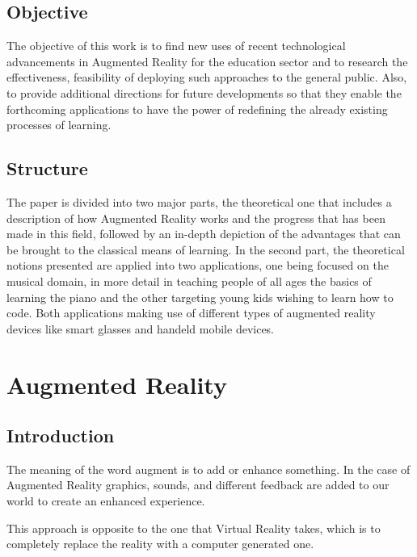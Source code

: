 \documentclass[12 pct]{report}
\begin{document}
\section{Objective}
The objective of this work is to find new uses of recent technological advancements in Augmented Reality for the education sector and to research the effectiveness, feasibility of deploying such approaches to the general public. Also, to provide additional directions for future developments so that they enable the forthcoming applications to have the power of redefining the already existing processes of learning.

\section{Structure}
The paper is divided into two major parts, the theoretical one that includes a description of how Augmented Reality works and the progress that has been made in this field, followed by an in-depth depiction of the advantages that can be brought to the classical means of learning. In the second part, the theoretical notions presented are applied into two applications, one being focused on the musical domain, in more detail in teaching people of all ages the basics of learning the piano and the other targeting young kids wishing to learn how to code. Both applications making use of different types of augmented reality devices like smart glasses and handeld mobile devices.
\chapter{Augmented Reality}

\section{Introduction}
The meaning of the word augment is to add or enhance something. In the case of Augmented Reality \cite{milgram1995augmented} graphics, sounds, and different feedback are added to our world to create an enhanced experience.

This approach is opposite to the one that Virtual Reality \cite{burdea2003virtual}  takes, which is to completely replace the reality with a computer generated one.
\end{document}
